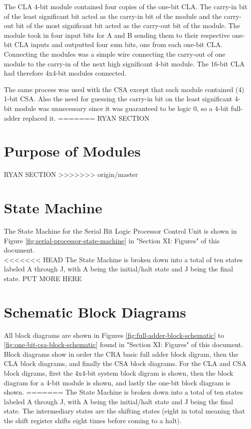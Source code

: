 \documentclass[journal, twocolumn, final,11pt,letterpaper]{IEEEtran}
\begin{document}
The CLA 4-bit module contained four copies of the one-bit CLA. The carry-in bit of the least significant bit acted as the carry-in bit of the module and the carry-out bit of the most significant bit acted as the carry-out bit of the module.  The module took in four input bits for A and B sending them to their respective one-bit CLA inputs and outputted four sum bits, one from each one-bit CLA.  Connecting the modules was a simple wire connecting the carry-out of one module to the carry-in of the next high significant 4-bit module.  The 16-bit CLA had therefore 4x4-bit modules connected.

The same process was used with the CSA except that each module contained (4) 1-bit CSA.  Also the need for guessing the carry-in bit on the least significant 4-bit module was unnecessary since it was guaranteed to be logic 0, so a 4-bit full-adder replaced it.     
=======
RYAN SECTION

\section{Purpose of Modules}
RYAN SECTION
>>>>>>> origin/master

\section{State Machine}
The State Machine for the Serial Bit Logic Processor Control Unit is shown in Figure  \ref{fig:serial-processor-state-machine} in "Section XI: Figures" of this document.  \\

<<<<<<< HEAD
The State Machine is broken down into a total of ten states labeled A through J, with A being the initial/halt state and J being the final state. PUT MORE HERE
	
\section{Schematic Block Diagrams}
All block diagrams are shown in Figures \ref{fig:full-adder-block-schematic} to \ref{fig:one-bit-csa-block-schematic} found in "Section XI: Figures" of this document.  Block diagrams show in order the CRA basic full adder block digram, then the CLA block diagrams, and finally the CSA block diagrams.  For the CLA and CSA block digrams, first the 4x4-bit system block digram is shown, then the block diagram for a 4-bit module is shown, and lastly the one-bit block diagram is shown.    
=======
The State Machine is broken down into a total of ten states labeled A through J, with A being the initial/halt state and J being the final state. The intermediary states are the shifting states (eight in total meaning that the shift register shifts eight times before coming to a halt).
	
\end{document}
